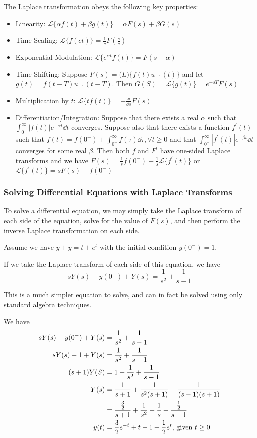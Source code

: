 \documentclass[12pt]{article}
\begin{document}
The Laplace transformation obeys the following key properties:
\begin{itemize}
\item Linearity: $\mathcal{L} \{ \alpha f(t) + \beta g(t) \} = \alpha F(s) + \beta G(s)$
\item Time-Scaling: $\mathcal{L} \{f(ct)\} = \frac{1}{c}F(\frac{s}{c})$
\item Exponential Modulation: $\mathcal{L} \{e^{\alpha t} f(t)\} = F(s-\alpha)$
\item Time Shifting: Suppose $F(s) = \mathcal(L) \{ f(t) u_{-1}(t) \}$ and let $g(t) = f(t - T)u_{-1}(t - T)$. Then $G(S) = \mathcal{L} \{g(t)\} = e^{-sT} F(s)$
\item Multiplication by $t$: $\mathcal{L} \{ tf(t) \} = -\frac{\dd}{\dd s} F(s)$
\item Differentiation/Integration: Suppose that there exists a real $\alpha$ such that $\displaystyle\int_{0^-}^\infty |f(t)| e^{-\alpha t} \dd t$ converges. Suppose also that there exists a function $f^\prime(t)$ such that $f(t) = f(0^-) + \displaystyle\int_{0^-}^\infty f(\tau) \dd \tau, \forall t \geq 0$ and that $\displaystyle\int_{0^-}^\infty |f^\prime(t)| e^{-\beta t} \dd t$ converges for some real $\beta$. Then both $f$ and $F^\prime$ have one-sided Laplace transforms and we have $F(s) = \frac{1}{s}f(0^-) + \frac{1}{s} \mathcal{L} \{f^\prime(t) \}$ or $\mathcal{L} \{ f^\prime(t) \} = sF(s) - f(0^-)$
\end{itemize}

\subsubsection{Solving Differential Equations with Laplace Transforms}
To solve a differential equation, we may simply take the Laplace transform of each side of the equation, solve for the value of $F(s)$, and then perform the inverse Laplace transformation on each side.

\begin{example}
Assume we have $\dot y + y = t + e^t$ with the initial condition $y(0^-) = 1$.

If we take the Laplace transform of each side of this equation, we have \[ sY(s) - y(0^-) + Y(s) = \frac{1}{s^2} + \frac{1}{s-1} \]

This is a much simpler equation to solve, and can in fact be solved using only standard algebra techniques.

We have
\begin{align*}
sY(s) - y(0^-) + Y(s) &= \frac{1}{s^2} + \frac{1}{s-1}\\
sY(s) - 1 + Y(s) &= \frac{1}{s^2} + \frac{1}{s-1}\\
(s+1)Y(S) &= 1 + \frac{1}{s^2} + \frac{1}{s-1}\\
Y(s) &= \frac{1}{s+1} + \frac{1}{s^2(s+1)} + \frac{1}{(s-1)(s+1)}\\
&= \frac{\frac{3}{2}}{s+1} + \frac{1}{s^2} - \frac{1}{s} + \frac{\frac{1}{2}}{s-1}\\
y(t) &= \frac{3}{2}e^{-t} + t - 1 + \frac{1}{2} e^t \text{, given }t \geq 0
\end{align*}
\end{example}
\end{document}
